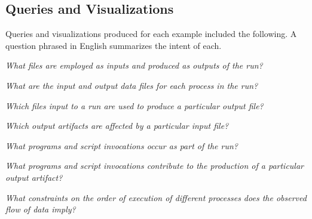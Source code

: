  \subsection{Queries and Visualizations}

Queries and visualizations produced for each example included the following. A question phrased in English summarizes the intent of each.

\emph{What files are employed as inputs and produced as outputs of the run?}

\emph{What are the input and output data files for each process in the run?}

\emph{Which files input to a run are used to produce a particular output file?}

\emph{Which output artifacts are affected by a particular input file?}

\emph{What programs and script invocations occur as part of the run?}

\emph{What programs and script invocations contribute to the production of a particular output artifact?}

\emph{What constraints on the order of execution of different processes does the observed flow of data imply?}

